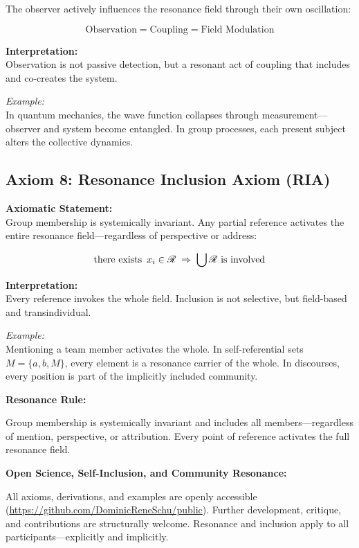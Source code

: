 \documentclass[12pt]{iopart}
\providecommand{\mathcal}[1]{\mathscr{#1}}
\providecommand{\text}[1]{\mbox{#1}}
\providecommand{\exists}{\hbox{there exists }}
\begin{document}
The observer actively influences the resonance field through their own oscillation:

$$
\text{Observation} = \text{Coupling} = \text{Field Modulation}
$$

\textbf{Interpretation:}\\
Observation is not passive detection, but a resonant act of coupling that includes and co-creates the system.

\textit{Example:}\\
In quantum mechanics, the wave function collapses through measurement—observer and system become entangled. In group processes, each present subject alters the collective dynamics.

\newpage

\subsection{Axiom 8: Resonance Inclusion Axiom (RIA)}

\textbf{Axiomatic Statement:}\\
Group membership is systemically invariant. Any partial reference activates the entire resonance field—regardless of perspective or address:

$$
\exists\, x_i \in \mathcal{R} \;\Rightarrow\; \bigcup \mathcal{R} \text{ is involved}
$$

\textbf{Interpretation:}\\
Every reference invokes the whole field. Inclusion is not selective, but field-based and transindividual.

\textit{Example:}\\
Mentioning a team member activates the whole. In self-referential sets $M = \{a, b, M\}$, every element is a resonance carrier of the whole. In discourses, every position is part of the implicitly included community.

\bigskip

\noindent
\textbf{Resonance Rule:}

Group membership is systemically invariant and includes all members—regardless of mention, perspective, or attribution. Every point of reference activates the full resonance field.

\bigskip

\noindent
\textbf{Open Science, Self-Inclusion, and Community Resonance:}

All axioms, derivations, and examples are openly accessible (\url{https://github.com/DominicReneSchu/public}). Further development, critique, and contributions are structurally welcome. Resonance and inclusion apply to all participants—explicitly and implicitly.
\end{document}

